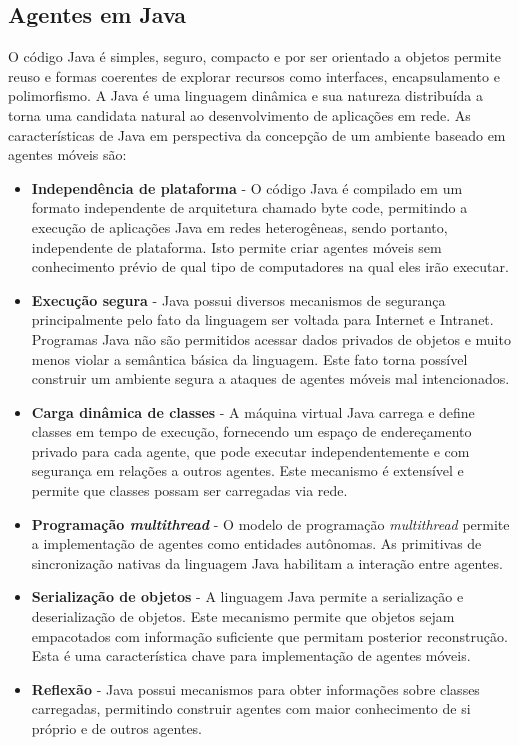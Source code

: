 \subsection{Agentes em Java}
O código Java é simples, seguro, compacto e por ser orientado a objetos permite reuso e formas coerentes de explorar recursos como interfaces, encapsulamento e polimorfismo. A Java é uma linguagem dinâmica e sua natureza distribuída a torna uma candidata natural ao desenvolvimento de aplicações em rede. As características de Java em perspectiva da concepção de um ambiente baseado em agentes móveis são:
\begin{itemize}
	\item \textbf{Independência de plataforma} - O código Java é compilado em um formato independente de arquitetura chamado byte code, permitindo a execução de aplicações Java em redes heterogêneas, sendo portanto, independente de plataforma. Isto permite criar agentes móveis sem conhecimento prévio de qual tipo de computadores na qual eles irão executar.
	\item \textbf{Execução segura} - Java possui diversos mecanismos de segurança principalmente pelo fato da linguagem ser voltada para Internet e Intranet. Programas Java não são permitidos acessar dados privados de objetos e muito menos violar a semântica básica da linguagem. Este fato torna possível construir um ambiente segura a ataques de agentes móveis mal intencionados.
	\item \textbf{Carga dinâmica de classes} - A máquina virtual Java carrega e define classes em tempo de execução, fornecendo um espaço de endereçamento privado para cada agente, que pode executar independentemente e com segurança em relações a outros agentes. Este mecanismo é extensível e permite que classes possam ser carregadas via rede.
	\item \textbf{Programação \textit{multithread}} - O modelo de programação \textit{multithread} permite a implementação de agentes como entidades autônomas. As primitivas de sincronização nativas da linguagem Java habilitam a interação entre agentes.
	\item \textbf{Serialização de objetos} - A linguagem Java permite a serialização e deserialização de objetos. Este mecanismo permite que objetos sejam empacotados com informação suficiente que permitam posterior reconstrução. Esta é uma característica chave para implementação de agentes móveis.

	\item \textbf{Reflexão} - Java possui mecanismos para obter informações sobre classes carregadas, permitindo construir agentes com maior conhecimento de si próprio e de outros agentes.

\end{itemize}

